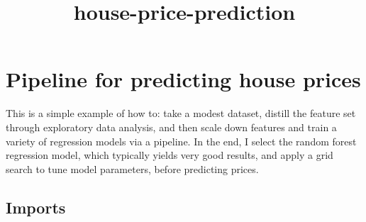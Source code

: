 \documentclass[11pt]{article}
\title{house-price-prediction}
\begin{document}
    
    
    \maketitle
    
    

    
    \section{Pipeline for predicting house
prices}\label{pipeline-for-predicting-house-prices}

This is a simple example of how to: take a modest dataset, distill the
feature set through exploratory data analysis, and then scale down
features and train a variety of regression models via a pipeline. In the
end, I select the random forest regression model, which typically yields
very good results, and apply a grid search to tune model parameters,
before predicting prices.

    \subsection{Imports}\label{imports}
\end{document}
